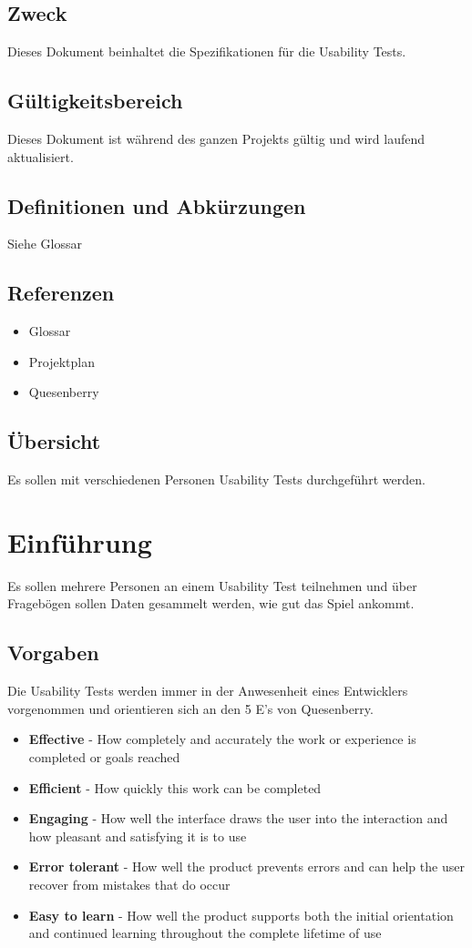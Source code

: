 \documentclass[11pt]{scrartcl}
\begin{document}
\subsection{Zweck}
Dieses Dokument beinhaltet die Spezifikationen für die Usability Tests.
\subsection{Gültigkeitsbereich}
Dieses Dokument ist während des ganzen Projekts gültig und wird laufend aktualisiert.
\subsection{Definitionen und Abkürzungen}
Siehe Glossar
\subsection{Referenzen}
\begin{itemize}
  \item Glossar
  \item Projektplan
  \item Quesenberry
\end{itemize}
\subsection{Übersicht}
Es sollen mit verschiedenen Personen Usability Tests durchgeführt werden.

\section{Einführung}
Es sollen mehrere Personen an einem Usability Test teilnehmen und über 
Fragebögen sollen Daten gesammelt werden, wie gut das Spiel ankommt.

\subsection{Vorgaben}
Die Usability Tests werden immer in der Anwesenheit eines Entwicklers 
vorgenommen und orientieren sich an den 5 E's von Quesenberry.
\begin{itemize}
  \item \textbf{Effective} - How completely and accurately the work or experience 
  is completed or goals reached
  \item \textbf{Efficient} - How quickly this work can be completed
  \item \textbf{Engaging} - How well the interface draws the user into the 
  interaction and how pleasant and satisfying it is to use
  \item \textbf{Error tolerant} - How well the product prevents errors and can help the 
  user recover from mistakes that do occur
  \item \textbf{Easy to learn} - How well the product supports both the initial orientation and continued 
  learning throughout the complete lifetime of use
\end{itemize}
\end{document}
